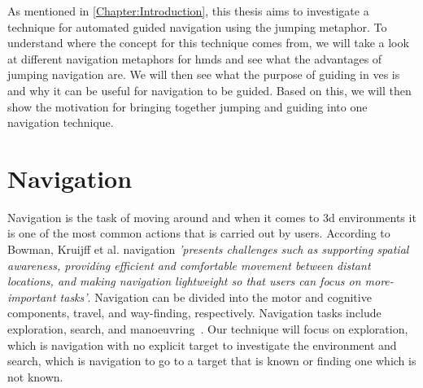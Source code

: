 \label{Chapter:Related Work}
As mentioned in \cref{Chapter:Introduction}, this thesis aims to investigate a technique for automated guided navigation using the jumping metaphor. To understand where the concept for this technique comes from, we will take a look at different navigation metaphors for \acrshort{hmd}s and see what the advantages of jumping navigation are. We will then see what the purpose of guiding in \acrshort{ve}s is and why it can be useful for navigation to be guided. Based on this, we will then show the motivation for bringing together jumping and guiding into one navigation technique. 

\section{Navigation}
\label{section RW: Navigation}

Navigation is the task of moving around and when it comes to \acrfull{3d} environments it is one of the most common actions that is carried out by users. According to Bowman, Kruijff et al. navigation \textit{'presents challenges such as supporting spatial awareness, providing efficient and comfortable movement between distant locations, and making navigation lightweight so that users can focus on more-important tasks'}. Navigation can be divided into the motor and cognitive components, travel, and way-finding, respectively. Navigation tasks include exploration, search, and manoeuvring~\cite{Bowman2001}. Our technique will focus on exploration, which is navigation with no explicit target to investigate the environment and search, which is navigation to go to a target that is known or finding one which is not known.

